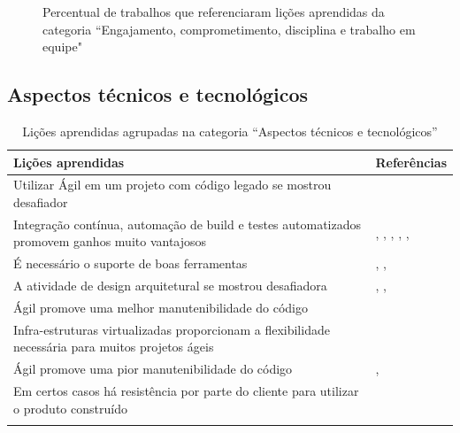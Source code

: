 \begin{figure}[H]
	\centering
	\captionsetup{justification=centering}
	\caption{Percentual de trabalhos que referenciaram lições aprendidas da categoria ``Engajamento, comprometimento, disciplina e trabalho em equipe"}
	\label{fig:comprometimento}
\end{figure}

\subsection{Aspectos técnicos e tecnológicos}

\begin{table}[H]
	\centering
	\captionsetup{justification=centering}
	\begin{tabularx}{\linewidth}{ | X | p{5cm} | } \hline \textbf{Lições aprendidas} & \textbf{Referências} \\ \hline
		Utilizar Ágil em um projeto com código legado se mostrou desafiador & \cite{Block2011} \\ \hline
		Integração contínua, automação de build e testes automatizados promovem ganhos muito vantajosos & \cite{Block2011}, \cite{Microsoft2013}, \cite{Korhonen2010}, \cite{Cisco2011}, \cite{Lapham2012}, \cite{Eunha2012} \\ \hline
		É necessário o suporte de boas ferramentas & \cite{Fitzgerald2013}, \cite{Microsoft2013}, \cite{Arikpo2011} \\ \hline
		A atividade de design arquitetural se mostrou desafiadora & \cite{Bustard2013}, \cite{Radha2012}, \cite{Piegas2012} \\ \hline
		Ágil promove uma melhor manutenibilidade do código & \cite{Bustard2013} \\ \hline
		Infra-estruturas virtualizadas proporcionam a flexibilidade necessária para muitos projetos ágeis & \cite{Radha2012} \\ \hline
		Ágil promove uma pior manutenibilidade do código & \cite{Nokia2013}, \cite{Queiroz2013} \\ \hline
		Em certos casos há resistência por parte do cliente para utilizar o produto construído & \cite{Stefano2013} \\ \hline
	\caption{Lições aprendidas agrupadas na categoria ``Aspectos técnicos e tecnológicos''}
	\end{tabularx}
\end{table}

